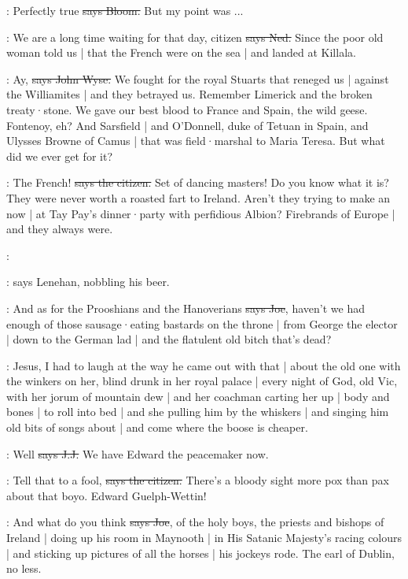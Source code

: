 \Bloom:
Perfectly true
\sout{says Bloom.}
But my point was ...

\lambert:
We are a long time waiting for that day,
citizen
\sout{says Ned.}
Since the poor old woman told us |
that the French were on the sea |
and landed at Killala.

\johnwyse:
Ay,
\sout{says John Wyse.}
We fought for the royal Stuarts that reneged us |
against the Williamites |
and they betrayed us.
Remember Limerick and the broken treaty·stone.
We gave our best blood to France and Spain,
the wild geese.
Fontenoy,
eh?
And Sarsfield |
and O'Donnell,
duke of Tetuan in Spain,
and Ulysses Browne of Camus |
that was field·marshal to Maria Teresa.
But what did we ever get for it?

\citizen:
The French!
\sout{says the citizen.}
Set of dancing masters!
Do you know what it is?
They were never worth a roasted fart to Ireland.
Aren't they trying to make an  now |
at Tay Pay's dinner·party with perfidious Albion?
Firebrands of Europe |
and they always were.

\lenehan:

\Nq:
says Lenehan,
nobbling his beer.

\joe:
And as for the Prooshians and the Hanoverians
\sout{says Joe},
haven't we had enough of those sausage·eating bastards on the throne |
from George the elector |
down to the German lad |
and the flatulent old bitch that's dead?

\Nq:
Jesus,
I had to laugh at the way he came out with that |
about the old one with the winkers on her,
blind drunk in her royal palace |
every night of God,
old Vic,
with her jorum of mountain dew |
and her coachman carting her up |
body and bones |
to roll into bed |
and she pulling him by the whiskers |
and singing him old bits of songs about  |
and come where the boose is cheaper.

\jjom:
Well
\sout{says J.J.}
We have Edward the peacemaker now.

\citizen:
Tell that to a fool,
\sout{says the citizen.}
There's a bloody sight more pox than pax about that boyo.
Edward Guelph-Wettin!

\joe:
And what do you think
\sout{says Joe},
of the holy boys,
the priests and bishops of Ireland |
doing up his room in Maynooth |
in His Satanic Majesty's racing colours |
and sticking up pictures of all the horses |
his jockeys rode.
The earl of Dublin,
no less.

